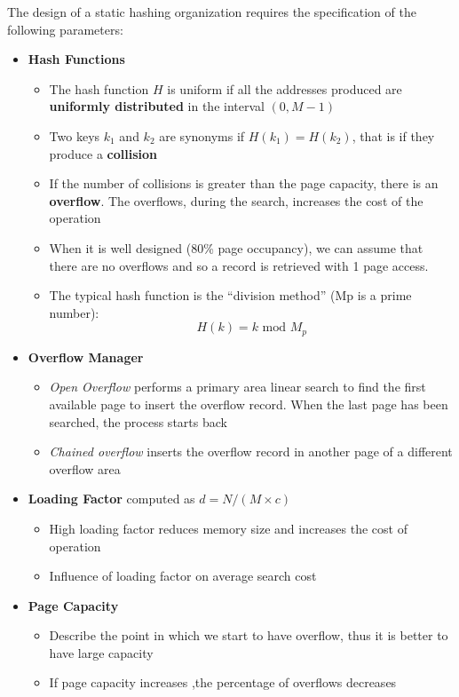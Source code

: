 The design of a static hashing organization requires the specification of the following parameters:
\begin{itemize}
    \item \textbf{Hash Functions}
    \begin{itemize}
        \item The hash function \(H\) is uniform if all the addresses produced are \textbf{uniformly distributed}  in the interval \((0, M-1)\)
        \item Two keys \(k_1\) and \(k_2\) are synonyms if \(H(k_1) = H(k_2)\), that is if they produce a \textbf{collision}
        \item If the number of collisions is greater than the page capacity, there is an \textbf{overflow}. The overflows, during the search, increases the cost of the operation
        \item When it is well designed (80\% page occupancy), we can assume that there are no  overflows and so a record is retrieved with 1 page access.
        \item The typical hash function is the “division method” (Mp is a prime number):
        \[H(k) = k \text{ mod } M_p\]
    \end{itemize}
    \item \textbf{Overflow Manager}
    \begin{itemize}
        \item \textit{Open Overflow} performs a primary area linear search to find the first available page to insert the overflow record. When the last page has been searched, the process starts back
        \item \textit{Chained overflow} inserts the overflow record in another page of a different overflow area
    \end{itemize}
    \item \textbf{Loading Factor} computed as \(d = N/(M \times c)\)
    \begin{itemize}
        \item High loading factor reduces memory size and increases the cost of operation 
        \item Influence of loading factor on average search cost
    \end{itemize}
    \item \textbf{Page Capacity}
    \begin{itemize}
        \item Describe the point in which we start to have overflow, thus it is better to have large capacity
        \item If page capacity increases ,the percentage of overflows decreases 
    \end{itemize}
\end{itemize}

